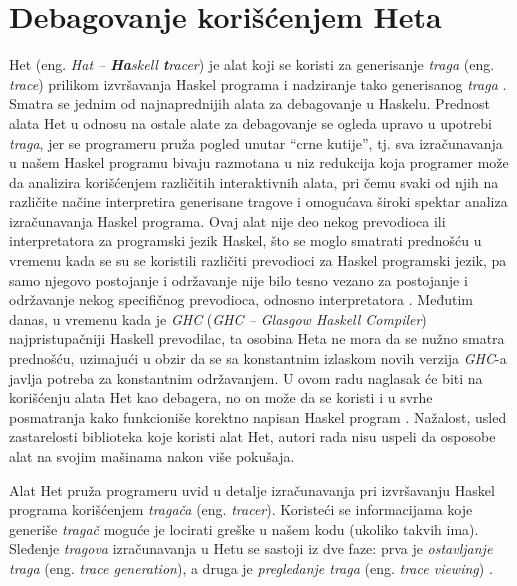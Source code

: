 \documentclass[a4paper]{article}
\begin{document}
{\section{Debagovanje korišćenjem Heta}
Het (eng. {\em Hat -- {\bf \em Ha}skell {\bf \em t}racer}) je alat koji se koristi za generisanje {\em traga} (eng. {\em trace}) prilikom izvršavanja Haskel programa
i nadziranje tako generisanog {\em traga} \cite{chitil2002transforming}. Smatra se jednim od najnaprednijih alata za debagovanje u Haskelu. Prednost alata Het u odnosu na ostale alate za debagovanje 
se ogleda upravo u upotrebi {\em traga}, jer se programeru pruža pogled unutar ``crne kutije'', tj. sva izračunavanja u našem Haskel programu bivaju razmotana u niz redukcija koja programer može da analizira korišćenjem različitih interaktivnih alata, pri čemu svaki od njih na različite načine interpretira generisane tragove i omogućava široki spektar analiza izračunavanja Haskel programa.
Ovaj alat nije deo nekog prevodioca ili interpretatora za programski jezik Haskel,
što se moglo smatrati prednošću u vremenu kada se su se koristili različiti prevodioci za Haskel programski jezik, pa samo njegovo postojanje i održavanje nije bilo tesno vezano za postojanje i održavanje nekog specifičnog prevodioca, odnosno interpretatora \cite{chitil2002transforming}. Međutim danas, u vremenu kada je {\em GHC} ({\em GHC -- Glasgow Haskell Compiler}) najpristupačniji Haskell prevodilac, ta osobina Heta ne mora da se nužno smatra prednošću, uzimajući u obzir da se sa konstantnim izlaskom novih verzija {\em GHC}-a javlja potreba za konstantnim održavanjem.
U ovom radu naglasak će biti na korišćenju alata Het kao debagera, no on može da se koristi i u svrhe posmatranja kako funkcioniše korektno napisan Haskel program \cite{wallace2001multiple}.
Nažalost, usled zastarelosti biblioteka koje koristi alat Het, autori rada nisu uspeli da osposobe alat na svojim mašinama nakon više pokušaja. 

Alat Het pruža programeru uvid u detalje izračunavanja pri izvršavanju Haskel programa korišćenjem {\em tragača} (eng. {\em tracer}). 
Koristeći se informacijama koje generiše {\em tragač} moguće je locirati greške u našem kodu (ukoliko takvih ima).
Sleđenje {\em tragova} izračunavanja u Hetu se sastoji iz dve faze: prva je {\em ostavljanje traga} (eng. {\em trace generation}), a druga je {\em pregledanje traga} (eng. {\em trace viewing}) \cite{chitil2002transforming}.

}
\end{document}
